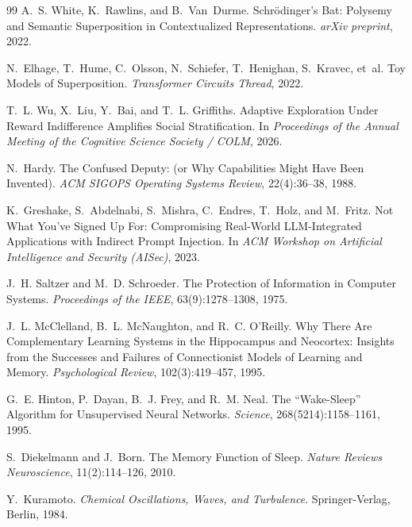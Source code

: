 \documentclass[10pt, twocolumn, a4paper]{article}
\begin{document}
\begin{thebibliography}{99}
A.~S. White, K.~Rawlins, and B.~Van~Durme.
\newblock Schr{\"o}dinger's Bat: Polysemy and Semantic Superposition in Contextualized Representations.
\newblock \emph{arXiv preprint}, 2022.

N.~Elhage, T.~Hume, C.~Olsson, N.~Schiefer, T.~Henighan, S.~Kravec, et~al.
\newblock Toy Models of Superposition.
\newblock \emph{Transformer Circuits Thread}, 2022.

T.~L. Wu, X.~Liu, Y.~Bai, and T.~L. Griffiths.
\newblock Adaptive Exploration Under Reward Indifference Amplifies Social Stratification.
\newblock In \emph{Proceedings of the Annual Meeting of the Cognitive Science Society / COLM}, 2026.

N.~Hardy.
\newblock The Confused Deputy: (or Why Capabilities Might Have Been Invented).
\newblock \emph{ACM SIGOPS Operating Systems Review}, 22(4):36--38, 1988.

K.~Greshake, S.~Abdelnabi, S.~Mishra, C.~Endres, T.~Holz, and M.~Fritz.
\newblock Not What You've Signed Up For: Compromising Real-World LLM-Integrated Applications with Indirect Prompt Injection.
\newblock In \emph{ACM Workshop on Artificial Intelligence and Security (AISec)}, 2023.

J.~H. Saltzer and M.~D. Schroeder.
\newblock The Protection of Information in Computer Systems.
\newblock \emph{Proceedings of the IEEE}, 63(9):1278--1308, 1975.

J.~L. McClelland, B.~L. McNaughton, and R.~C. O'Reilly.
\newblock Why There Are Complementary Learning Systems in the Hippocampus and Neocortex: Insights from the Successes and Failures of Connectionist Models of Learning and Memory.
\newblock \emph{Psychological Review}, 102(3):419--457, 1995.

G.~E. Hinton, P.~Dayan, B.~J. Frey, and R.~M. Neal.
\newblock The ``Wake-Sleep'' Algorithm for Unsupervised Neural Networks.
\newblock \emph{Science}, 268(5214):1158--1161, 1995.

S.~Diekelmann and J.~Born.
\newblock The Memory Function of Sleep.
\newblock \emph{Nature Reviews Neuroscience}, 11(2):114--126, 2010.

Y.~Kuramoto.
\newblock \emph{Chemical Oscillations, Waves, and Turbulence}.
\newblock Springer-Verlag, Berlin, 1984.


\end{thebibliography}
\end{document}
